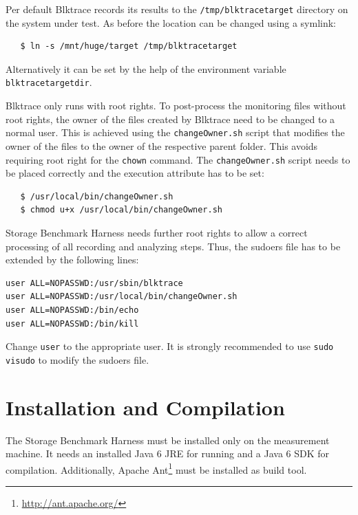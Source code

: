 Per default Blktrace records its results to the \texttt{/tmp/blktracetarget} directory on the system under test. As before the
location can be changed using a symlink:
\begin{lstlisting}
   $ ln -s /mnt/huge/target /tmp/blktracetarget
\end{lstlisting}
Alternatively it can be set by the help of the environment variable \texttt{blktracetargetdir}. 

Blktrace only runs with root rights. To post-process the monitoring files without root rights, the owner of the files created by Blktrace need to be changed to a normal user. This is achieved using the \texttt{changeOwner.sh} script that modifies the owner of the files to the owner of the respective parent folder. This avoids requiring root right for the \texttt{chown} command. The \texttt{changeOwner.sh}
script needs to be placed correctly and the execution attribute has to be set:
\begin{lstlisting}
   $ /usr/local/bin/changeOwner.sh
   $ chmod u+x /usr/local/bin/changeOwner.sh
\end{lstlisting}

Storage Benchmark Harness needs further root rights to allow a correct processing of all recording and analyzing steps. Thus, the
sudoers file has to be extended by the following lines:
\begin{lstlisting}
user ALL=NOPASSWD:/usr/sbin/blktrace
user ALL=NOPASSWD:/usr/local/bin/changeOwner.sh
user ALL=NOPASSWD:/bin/echo
user ALL=NOPASSWD:/bin/kill
\end{lstlisting}
Change \texttt{user} to the appropriate user. It is strongly recommended to use \texttt{sudo visudo} to modify the sudoers
file.

\chapter{Installation and Compilation}
\label{ch:Installation}
The Storage Benchmark Harness must be installed only on the measurement machine.
It needs an installed Java 6 JRE for running and a Java 6 SDK for compilation.
Additionally, Apache Ant\footnote{\url{http://ant.apache.org/}} must be
installed as build tool.


